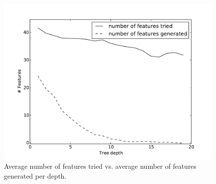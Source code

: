\documentclass[twoside,11pt]{article}
\theoremstyle{definition}
\begin{document}
\begin{figure}[h!]
	\centering
	\includegraphics[scale=0.4]{features_per_depth}
	\caption{Average number of features tried vs. average number of features generated per depth.}
	\label{fig:features_per_depth}
\end{figure}


\end{document}
